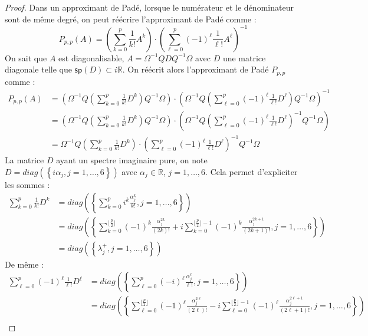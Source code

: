 \begin{proof}
  Dans un approximant de Padé, lorsque le numérateur et le dénominateur sont de même degré, on peut réécrire l'approximant de Padé comme :
  $$
    P_{p,p}(A) = \left( \sum_{k=0}^p \frac{1}{k!}A^k \right)\cdot\left( \sum_{\ell=0}^p (-1)^\ell\frac{1}{\ell!}A^\ell \right)^{-1}
  $$
  On sait que $A$ est diagonalisable, $A=\Omega^{-1}Q D Q^{-1}\Omega$ avec $D$ une matrice diagonale telle que $\mathsf{sp}(D)\subset i\mathbb{R}$. On réécrit alors l'approximant de Padé $P_{p,p}$ comme :
  $$
    \begin{aligned}
      P_{p,p}(A) &= \left( \Omega^{-1}Q \left( \sum_{k=0}^p \frac{1}{k!}D^k \right) Q^{-1}\Omega \right)
                      \cdot
                    \left( \Omega^{-1}Q \left(\sum_{\ell=0}^p (-1)^\ell \frac{1}{\ell!}D^\ell \right) Q^{-1}\Omega \right)^{-1} \\
                 &= \left( \Omega^{-1}Q \left( \sum_{k=0}^p \frac{1}{k!}D^k \right) Q^{-1}\Omega \right)
                      \cdot
                    \left( \Omega^{-1}Q \left(\sum_{\ell=0}^p (-1)^\ell \frac{1}{\ell!}D^\ell \right)^{-1} Q^{-1}\Omega \right) \\
                 &= \Omega^{-1}Q \left( \sum_{k=0}^p \frac{1}{k!}D^k \right) \cdot \left(\sum_{\ell=0}^p (-1)^\ell \frac{1}{\ell!}D^\ell \right)^{-1} Q^{-1}\Omega
    \end{aligned}
  $$
  La matrice $D$ ayant un spectre imaginaire pure, on note $D = diag\left(\left\{ i\alpha_j, j=1,\dots,6 \right\}\right)$ avec $\alpha_j\in\mathbb{R}$, $j=1,\dots,6$. Cela permet d'expliciter les sommes :
  $$
    \begin{aligned}
      \sum_{k=0}^p \frac{1}{k!}D^k & = diag\left(\left\{ \sum_{k=0}^p i^k\frac{\alpha_j^k}{k!} , j=1,\dots,6 \right\}\right) \\
                                   & = diag\left(\left\{ \sum_{k=0}^{\lfloor\frac{p}{2}\rfloor}(-1)^k\frac{\alpha_j^{2k}}{(2k)!} + i\sum_{k=0}^{\lfloor\frac{p}{2}\rfloor-1}(-1)^k\frac{\alpha_j^{2k+1}}{(2k+1)!} , j=1,\dots,6 \right\}\right) \\
                                   & = diag\left(\left\{ \lambda^+_j , j=1,\dots,6 \right\}\right)
    \end{aligned}
  $$
  De même :
  $$
    \begin{aligned}
      \sum_{\ell=0}^p (-1)^\ell\frac{1}{\ell!}D^\ell & = diag\left(\left\{ \sum_{\ell=0}^p(-i)^\ell\frac{\alpha_j^\ell}{\ell!} , j=1,\dots,6 \right\}\right) \\
                                                     & = diag\left(\left\{ \sum_{\ell=0}^{\lfloor\frac{p}{2}\rfloor}(-1)^\ell\frac{\alpha_j^{2\ell}}{(2\ell)!} - i\sum_{\ell=0}^{\lfloor\frac{p}{2}\rfloor-1}(-1)^\ell\frac{\alpha_j^{2\ell+1}}{(2\ell+1)!} , j=1,\dots,6 \right\}\right) \\

\end{aligned}$$
\end{proof}
